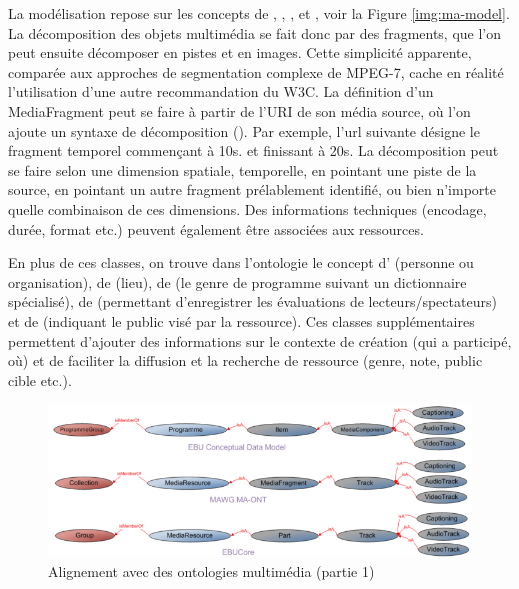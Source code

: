 La modélisation repose sur les concepts de , , ,  et , voir la Figure \ref{img:ma-model}.
La décomposition des objets multimédia se fait donc par des fragments, que l'on peut ensuite décomposer en pistes et en images.
Cette simplicité apparente, comparée aux approches de segmentation complexe de MPEG-7, cache en réalité l'utilisation d'une autre recommandation du W3C.
La définition d'un MediaFragment peut se faire à partir de l'URI de son média source, où l'on ajoute un syntaxe de décomposition (\cite{Hausenblas2011}).
Par exemple, l'url suivante  désigne le fragment temporel commençant à 10s. et finissant à 20s.
La décomposition peut se faire selon une dimension spatiale, temporelle, en pointant une piste de la source, en pointant un autre fragment prélablement identifié, ou bien n'importe quelle combinaison de ces dimensions.
Des informations techniques (encodage, durée, format etc.) peuvent également être associées aux ressources.

En plus de ces classes, on trouve dans l'ontologie le concept d' (personne ou organisation), de  (lieu), de  (le genre de programme suivant un dictionnaire spécialisé), de  (permettant d'enregistrer les évaluations de lecteurs/spectateurs) et de  (indiquant le public visé par la ressource).
Ces classes supplémentaires permettent d'ajouter des informations sur le contexte de création (qui a participé, où) et de faciliter la diffusion et la recherche de ressource (genre, note, public cible etc.).

\begin{figure}[ht!]
\centering
\includegraphics[width=\textwidth]{images/MA-alignement-A.png}
\caption{Alignement avec des ontologies multimédia (partie 1)}
\label{img:ma-alignement-A}
\end{figure}

